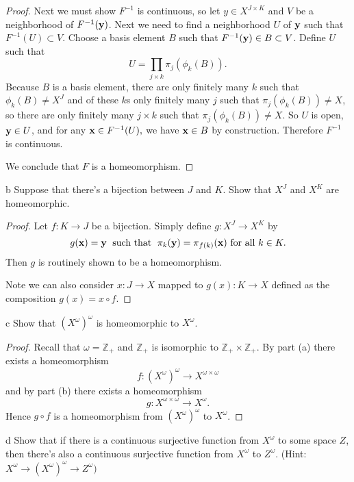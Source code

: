 \documentclass[11pt]{article}
\begin{document}
\begin{proof}
  Next we must show $F^{-1}$ is continuous, so let $y\in X^{J\times K}$ and $V$
  be a neighborhood of $F^{-1}(\vb y)$. Next we need to find a neighborhood $U$
  of $\vb y$ such that $F^{-1}(U) \subset V$. Choose a basis element $B$ such
  that $F^{-1}(\vb y) \in B \subset V$. Define $U$ such that
  \[ U = \prod_{j \times k} \pi_j(\phi_k(B)). \]
  Because $B$ is a basis element, there are only finitely many $k$ such that
  $\phi_k(B) \neq X^J$ and of these $k$s only finitely many $j$ such that
  $\pi_j(\phi_k(B)) \neq X$, so there are only finitely many $j \times k$ such that
  $\pi_j(\phi_k(B)) \neq X$. So $U$ is open, $\vb y \in U$, and for any $\vb x \in F^{-1}(U),$
  we have $\vb x \in B$ by construction. Therefore $F^{-1}$ is continuous.

  We conclude that $F$ is a homeomorphism.
\end{proof}

\begin{p}{b}
  Suppose that there's a bijection between $J$ and $K$. Show that $X^J$ and
  $X^K$ are homeomorphic.
\end{p}

\begin{proof}
  Let $f: K \to J$ be a bijection. Simply define $g: X^J \to X^K$ by
  \[ g(\vb x) = \vb y \;\text{ such that }\;
  \pi_k(\vb y) = \pi_{f(k)}(\vb x) \text { for all } k \in K. \]
  Then $g$ is routinely shown to be a homeomorphism.

  Note we can also consider $x: J \to X$ mapped to $g(x) : K \to X$ defined as
  the composition $g(x) = x \circ f$.
\end{proof}

\begin{p}{c}
  Show that $(X^\omega)^\omega$ is homeomorphic to $X^\omega$.
\end{p}

\begin{proof}
  Recall that $\omega = \mathbb{Z}_+$ and $\mathbb{Z}_+$ is isomorphic to
  $\mathbb{Z}_+ \times \mathbb{Z}_+$. By part (a) there exists a homeomorphism
  \[ f : (X^\omega)^\omega \to X^{\omega \times \omega} \]
  and by part (b) there exists a homeomorphism
  \[ g : X^{\omega \times \omega} \to X^\omega. \]
  Hence $g \circ f$ is a homeomorphism from $(X^\omega)^\omega$ to $X^\omega$.

\end{proof}

\begin{p}{d}
  Show that if there is a continuous surjective function from $X^\omega$ to some
  space $Z$, then there's also a continuous surjective function from $X^\omega$
  to $Z^\omega$. (Hint: $X^\omega \to (X^\omega)^\omega \to Z^\omega)$
\end{p}
\end{document}
